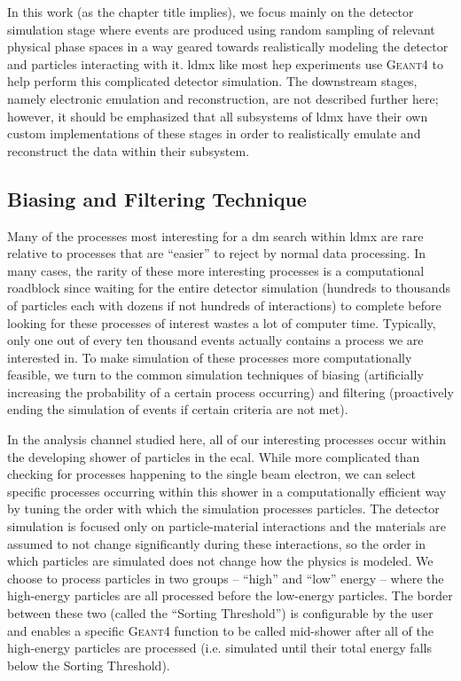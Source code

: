 In this work (as the chapter title implies), we focus mainly on the detector simulation stage where
events are produced using random sampling of relevant physical phase spaces in a way geared towards
realistically modeling the detector and particles interacting with it.
\ac{ldmx} like most \ac{hep} experiments use \textsc{Geant4}\cite{geant4} to help perform this
complicated detector simulation.
The downstream stages,
namely electronic emulation and reconstruction, are not described further here; however, it should
be emphasized that all subsystems of \ac{ldmx} have their own custom implementations of these
stages in order to realistically emulate and reconstruct the data within their subsystem.

\subsection{Biasing and Filtering Technique} \label{sec:bias-and-filter}
Many of the processes most interesting for a \ac{dm} search within \ac{ldmx} are rare relative to
processes that are ``easier'' to reject by normal data processing.
In many cases, the rarity of these more interesting processes is a computational roadblock
since waiting for the entire detector simulation (hundreds to thousands of particles each with dozens
if not hundreds of interactions) to complete before looking for these processes of interest
wastes a lot of computer time.
Typically, only one out of every ten thousand events actually contains a process we are interested in.
To make simulation of these processes more computationally feasible, we turn to the common simulation
techniques of biasing (artificially increasing the probability of a certain process occurring) and
filtering (proactively ending the simulation of events if certain criteria are not met).

In the analysis channel studied here, all of our interesting processes occur within the developing
shower of particles in the \ac{ecal}.
While more complicated than checking for processes happening to the single beam electron,
we can select specific processes occurring within this shower in a computationally
efficient way by tuning the order with which the simulation processes particles.
The detector simulation is focused only on particle-material interactions
and the materials are assumed to not change significantly during these interactions, so the order 
in which particles are simulated does not change how the physics is modeled.
We choose to process particles in two groups -- ``high'' and ``low'' energy --
where the high-energy particles are all processed before the low-energy particles.
The border between these two (called the ``Sorting Threshold'') is configurable by the user and
enables a specific \textsc{Geant4} function
to be called mid-shower after all of the high-energy particles are processed
(i.e. simulated until their total energy falls below the Sorting Threshold).

